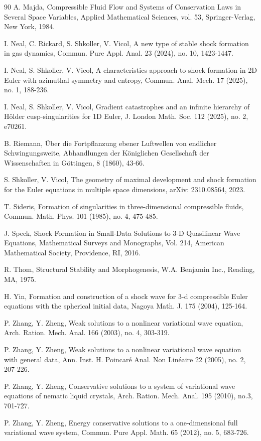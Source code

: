 \documentclass[11pt,reqno]{article}
\numberwithin{equation}{section}
\begin{document}
\begin{thebibliography}{90}
 A. Majda, Compressible Fluid Flow and Systems of Conservation Laws in Several Space Variables, Applied Mathematical Sciences, vol. 53, Springer-Verlag, New York, 1984.


 I. Neal, C. Rickard, S. Shkoller, V. Vicol, A new type of stable shock formation in gas dynamics, Commun. Pure Appl. Anal. 23 (2024), no. 10, 1423-1447.

 I. Neal, S. Shkoller, V. Vicol, A characteristics approach to shock formation in 2D Euler with azimuthal symmetry and entropy, Commun. Anal. Mech. 17 (2025), no. 1, 188-236.

 I. Neal, S. Shkoller, V. Vicol, Gradient catastrophes and an infinite hierarchy of H\"older cusp-singularities for 1D Euler, J. London Math. Soc. 112 (2025), no. 2, e70261.

 B. Riemann, \"Uber die Fortpflanzung ebener Luftwellen von endlicher Schwingungsweite, Abhandlungen der K\"oniglichen Gesellschaft der Wissenschaften in G\"ottingen, 8 (1860), 43-66.

 S. Shkoller, V. Vicol, The geometry of maximal development and shock formation for the Euler equations in multiple space dimensions, arXiv: 2310.08564, 2023.

 T. Sideris, Formation of singularities in three-dimensional compressible fluids, Commun. Math. Phys. 101 (1985), no. 4, 475-485.

 J. Speck, Shock Formation in Small-Data Solutions to 3-D Quasilinear Wave Equations, Mathematical Surveys and Monographs, Vol. 214, American Mathematical Society, Providence, RI, 2016.

 R. Thom, Structural Stability and Morphogenesis, W.A. Benjamin Inc., Reading, MA, 1975.

 H. Yin, Formation and construction of a shock wave for 3-d compressible Euler equations with the spherical initial data, Nagoya Math. J. 175 (2004), 125-164.

 P. Zhang, Y. Zheng, Weak solutions to a nonlinear variational wave equation, Arch. Ration. Mech. Anal. 166 (2003), no. 4, 303-319.

 P. Zhang, Y. Zheng, Weak solutions to a nonlinear variational wave equation with general data, Ann. Inst. H. Poincar\'{e} Anal. Non Lin\'{e}aire 22 (2005), no. 2, 207-226.

 P. Zhang, Y. Zheng, Conservative solutions to a system of variational wave equations of nematic liquid crystals, Arch. Ration. Mech. Anal. 195 (2010), no.3, 701-727.

 P. Zhang, Y. Zheng, Energy conservative solutions to a one-dimensional full variational wave system, Commun. Pure Appl. Math. 65 (2012), no. 5, 683-726.





\end{thebibliography}
\end{document}
